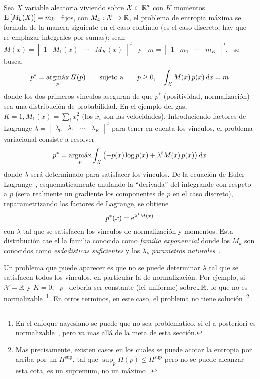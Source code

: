 Sea $X$ variable aleatoria viviendo  sobre $\mathcal{X} \subset \mathbb{R}^d$ con $K$ momentos
\  $\operatorname{E}\left[ M_k(X)  \right]  = m_k$  \ fijos,  con  $M_x: \mathcal{X}  \to \mathbb{R}$,  el
problema  de entropia  m\'axima se  formula de  la manera  siguiente en  el caso
continuo (es el caso discreto, hay que re-emplazar integrales por sumas): sean \
$M(x) = \begin{bmatrix} 1  & M_1(x) & \cdots & M_K(x) \end{bmatrix}^t$  \ y \ $m
= \begin{bmatrix} 1 & m_1 & \cdots & m_K \end{bmatrix}^t$, \ se busca,
%
\[
p^* = \operatorname*{argm\acute{a}x}_p H(p) \qquad \mbox{sujeto a} \qquad p \ge 0, \quad \int_{\mathcal{X}} M(x)
\, p(x) \, dx = m
\]
%
donde   los  dos  primeros   vinculos  aseguran   de  que   $p^*$  (positividad,
normalizaci\'on) sea una distribuci\'on de  probabilidad. En el ejemplo del gas,
$K =  1, M_1(x) = \sum_i  x_i^2$ (los $x_i$ son  las velocidades). Introduciendo
factores de Lagrange $\lambda = \begin{bmatrix} \lambda_0 & \lambda_1 & \cdots &
  \lambda_K  \end{bmatrix}^t$ para  tener en  cuenta los  vinculos,  el problema
variacional   consiste  a   resolver~\cite{Gelfom63,  Bru04,   Mil00,  CamMar09,
  CovTho06}
%
\[
p^* = \operatorname*{argm\acute{a}x}_p \int_{\mathcal{X}} \left( - p(x) \log p(x) + \lambda^t M(x) \, p(x) \right)
dx
\]
%
donde  $\lambda$  ser\'a  determinado  para  satisfacer  los  vinculos.   De  la
ecuaci\'on  de Euler-Lagrange~\cite{GelFom63, Bru04},  esquematicamente anulando
la ``derivada''  del integrande con respeto  a $p$ (sera  realmente un gradiente
los componentes  de $p$ en el  caso discreto), reparametrizando  los factores de
Lagrange, se obtiene
%
\[
p^*(x) = \operatorname{e}^{\lambda^t M(x)}
\]
%
con $\lambda$ tal que se  satisfacen los vinculos de normalizaci\'on y momentos.
Esta distribuci\'on  cae el la  familia conocida como {\it  familia exponencial}
donde  los  $M_k$  son  conocidos  como {\it  esdadisticas  suficientes}  y  los
$\lambda_k$  {\it   parametros  naturales}~\cite{Dar35,  Koo36,   And70,  Kay93,
  LehCas98, Rob07}.

Un problema que  puede aparecer es que no se puede  determinar $\lambda$ tal que
se  satisfacen todos  los vinculos,  en particular  la de  normalizaci\'on.  Por
ejemplo, si $\mathcal{X} = \mathbb{R}$ y $K = 0$, \ $p$ \ deberia ser constante (lei uniforme)
sobre\ldots $\mathbb{R}$, lo que no es normalizable~\footnote{En el enfoque aayesiano
  se   puede    que   no   sea    problematico,   si   el   a    posteriori   es
  normalizable~\cite{Rob07}, pero va  mas all\'a de la meta  de esta secci\'on.}.
En otros terminos,  en este caso, el problema  no tiene soluci\'on~\footnote{Mas
  precisamente,  existen casos en  los cuales  se puede  acotar la  entropia por
  arriba por un $H^{\sup}$, tal que  $\sup_p H(p) \le H^{\sup}$ pero no se puede
  alcanzar     esta     cota,     \ie      es     un     supremum,     no     un
  m\'aximo~\cite[sec.~12.3]{CovTho06}.}.


